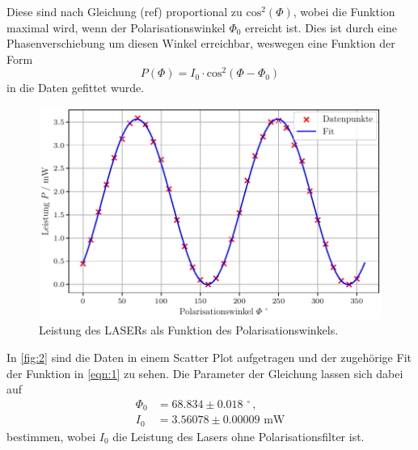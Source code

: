 \noindent
Diese sind nach Gleichung (ref) proportional zu $\text{cos}^2\left(\Phi\right)$, wobei die Funktion maximal wird, wenn der Polarisationswinkel $\Phi_0$ erreicht ist. Dies ist durch eine Phasenverschiebung um diesen Winkel erreichbar, weswegen eine Funktion der Form
\begin{equation}
  \label{eqn:1}
  P\left(\Phi\right) = I_0 \cdot \text{cos}^2\left(\Phi - \Phi_0\right)
\end{equation}
in die Daten gefittet wurde.
\begin{figure}[H]
  \centering
  \includegraphics[width=0.7\linewidth]{plots/pol.pdf}
  \caption{Leistung des LASERs als Funktion des Polarisationswinkels.}
  \label{fig:2}
\end{figure}
\noindent
In \autoref{fig:2} sind die Daten in einem Scatter Plot aufgetragen und der zugehörige Fit der Funktion in \autoref{eqn:1} zu sehen.
Die Parameter der Gleichung lassen sich dabei auf
\begin{align}
  \Phi_0 &= 68.834 \pm 0.018 \, \, ^\circ \, ,\\
  I_0 &= 3.56078 \pm 0.00009 \, \, \mathrm{mW}
\end{align}
bestimmen, wobei $I_0$ die Leistung des Lasers ohne Polarisationsfilter ist.
\noindent
\newpage
